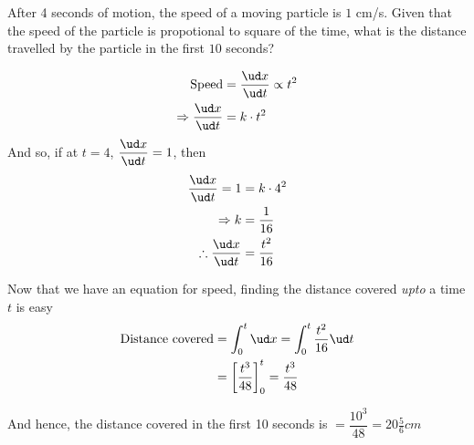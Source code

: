 

\question[3] After 4 seconds of motion, the speed of a moving particle is $1$ cm/s. 
Given that the speed of the particle is propotional to square of the time, what is
the distance travelled by the particle in the first $10$ seconds?


\ifprintanswers
\fi 

\begin{solution}[\halfpage]
  \begin{align}
     \text{Speed} &= \dfrac{\ud x}{\ud t} \propto t^2 \\
     \Rightarrow \dfrac{\ud x}{\ud t} &= k\cdot t^2
  \end{align}
  And so, if at $t=4$, $\dfrac{\ud x}{\ud t} = 1$, then 
  \begin{align}
     \dfrac{\ud x}{\ud t} = 1 &= k\cdot 4^2 \\
     \Rightarrow k &= \frac{1}{16} \\
     \therefore \dfrac{\ud x}{\ud t} &= \dfrac{t^2}{16}
  \end{align}
  
  Now that we have an equation for speed, finding the distance covered \textit{upto}
  a time $t$ is easy
  \begin{align}
     \text{Distance covered} &= \int_{0}^{t} \ud x = \int_0^{t}\dfrac{t^2}{16}\ud t \\
     &= \left[ \dfrac{t^3}{48}\right]_0^{t} = \dfrac{t^3}{48}
  \end{align}
  
  And hence, the distance covered in the first 10 seconds is $ = \dfrac{10^3}{48} = 20\frac{5}{6}cm$
\end{solution}
